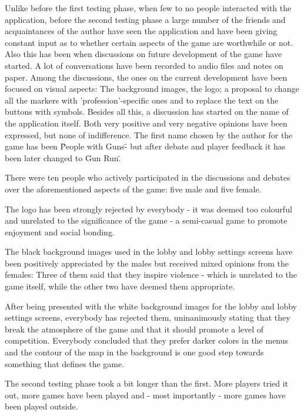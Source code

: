 \documentclass{article}
\begin{document}
Unlike before the first testing phase, when few to no people interacted with
the application, before the second testing phase a large number of the friends
and acquaintances of the author have seen the application and have been giving
constant input as to whether certain aspects of the game are worthwhile or not.
Also this has been when discussions on future development of the game have
started. A lot of conversations have been recorded to audio files and notes on
paper. Among the discussions, the ones on the current development have been
focused on visual aspects: The background images, the logo; a proposal to change
all the markers with 'profession'-specific ones and to replace the text on the
buttons with symbols. Besides all this, a discussion has started on the name of
the application itself. Both very positive and very negative opinions have been
expressed, but none of indifference. The first name chosen by the author for the
game has been \"People with Guns\" - but after debate and player
feedback it has been later changed to \"Gun Run\".\newline

There were ten people who actively participated in the discussions and debates
over the aforementioned aspects of the game: five male and five female.\newline

The logo has been strongly rejected by everybody - it was deemed too colourful
and unrelated to the significance of the game - a semi-casual game to promote
enjoyment and social bonding.\newline

The black background images used in the lobby and lobby settings screens have
been positively appreciated by the males but received mixed opinions from the
females: Three of them said that they inspire violence - which is unrelated
to the game itself, while the other two have deemed them appropriate.\newline

After being presented with the white background images for the lobby and lobby
settings screens, everybody has rejected them, uninanimously stating that they
break the atmosphere of the game and that it should promote a level of
competition. Everybody concluded that they prefer darker colors in the menus and
the contour of the map in the background is one good step towards something that
defines the game.\newline

The second testing phase took a bit longer than the first. More players tried it
out, more games have been played and - most importantly - more games have been
played outside.\newline
\end{document}
